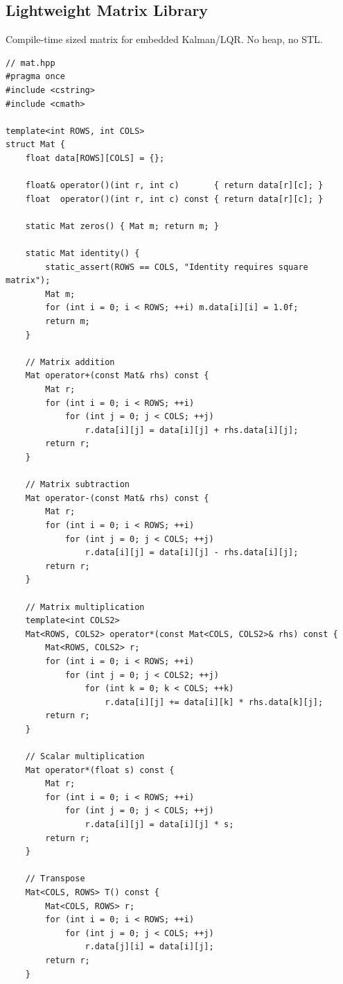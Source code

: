 \subsection{Lightweight Matrix Library}

Compile-time sized matrix for embedded Kalman/LQR. No heap, no STL.

\begin{verbatim}
// mat.hpp
#pragma once
#include <cstring>
#include <cmath>

template<int ROWS, int COLS>
struct Mat {
    float data[ROWS][COLS] = {};

    float& operator()(int r, int c)       { return data[r][c]; }
    float  operator()(int r, int c) const { return data[r][c]; }

    static Mat zeros() { Mat m; return m; }

    static Mat identity() {
        static_assert(ROWS == COLS, "Identity requires square matrix");
        Mat m;
        for (int i = 0; i < ROWS; ++i) m.data[i][i] = 1.0f;
        return m;
    }

    // Matrix addition
    Mat operator+(const Mat& rhs) const {
        Mat r;
        for (int i = 0; i < ROWS; ++i)
            for (int j = 0; j < COLS; ++j)
                r.data[i][j] = data[i][j] + rhs.data[i][j];
        return r;
    }

    // Matrix subtraction
    Mat operator-(const Mat& rhs) const {
        Mat r;
        for (int i = 0; i < ROWS; ++i)
            for (int j = 0; j < COLS; ++j)
                r.data[i][j] = data[i][j] - rhs.data[i][j];
        return r;
    }

    // Matrix multiplication
    template<int COLS2>
    Mat<ROWS, COLS2> operator*(const Mat<COLS, COLS2>& rhs) const {
        Mat<ROWS, COLS2> r;
        for (int i = 0; i < ROWS; ++i)
            for (int j = 0; j < COLS2; ++j)
                for (int k = 0; k < COLS; ++k)
                    r.data[i][j] += data[i][k] * rhs.data[k][j];
        return r;
    }

    // Scalar multiplication
    Mat operator*(float s) const {
        Mat r;
        for (int i = 0; i < ROWS; ++i)
            for (int j = 0; j < COLS; ++j)
                r.data[i][j] = data[i][j] * s;
        return r;
    }

    // Transpose
    Mat<COLS, ROWS> T() const {
        Mat<COLS, ROWS> r;
        for (int i = 0; i < ROWS; ++i)
            for (int j = 0; j < COLS; ++j)
                r.data[j][i] = data[i][j];
        return r;
    }


\end{verbatim}
